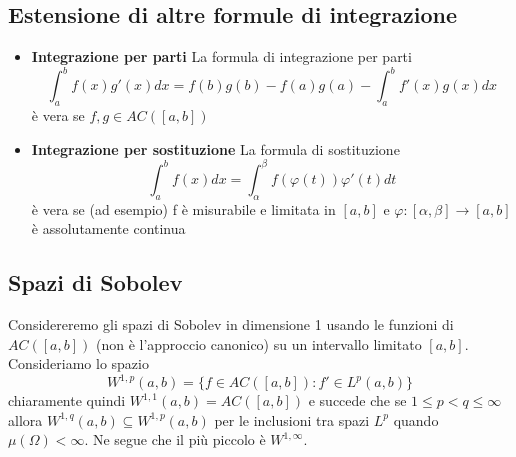 \subsection{Estensione di altre formule di integrazione}
\begin{itemize}[label = --]
    \item \textbf{Integrazione per parti} La formula di integrazione per parti
\[
    \int_{a} ^{b} f{(x)} g'{(x)}dx = f{(b)}g{(b)} - f{(a)}g{(a)} - \int_{a} ^{b}
    f'{(x)}g{(x)}dx
\]
    è vera se \(f, g \in AC([a,b])\) 
    \item \textbf{Integrazione per sostituzione} La formula di sostituzione
\[
    \int_a^{b} f{(x)} dx = \int_\alpha ^{\beta} f{(\varphi{(t)})}
    \varphi'{(t)}dt
\]
è vera se (ad esempio) f è misurabile e limitata in \([a,b]\) e \(\varphi :
[\alpha, \beta] \to [a,b]\) è assolutamente continua
\end{itemize}
\subsection{Spazi di Sobolev}
Considereremo gli spazi di Sobolev in dimensione 1 usando le funzioni di
\(AC([a,b])\) (non è l'approccio canonico) su un intervallo limitato \([a,b]\).
Consideriamo lo spazio
\[
    W^{1,p}(a,b) = \{f \in AC([a,b]): f' \in L^{p}(a,b)\} 
\]
chiaramente quindi \(W^{1,1}{(a,b)} = AC{([a,b])}\) e succede che se \(1 \le p <
q \le \infty\) allora \(W^{1,q}{(a,b)} \subseteq W^{1,p}{(a,b)} \) per le
inclusioni tra spazi \(L^{p}\) quando \(\mu{(\Omega)} < \infty\). Ne segue che
il più piccolo è \(W^{1, \infty}\).

